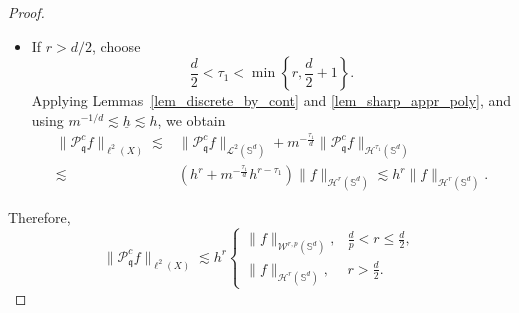 \documentclass[10pt,a4paper]{amsart}
\def\SS{\mathbb{S}}
\def\mq{\mathfrak{q}}
\def\pc{\mathcal{P}^c}
\begin{document}
\begin{proof}
\begin{itemize}
\begin{equation*}
\begin{split}
    \end{split}
\end{equation*}
    \item If $r>d/2$, choose
    \begin{equation*}
        \frac d2<\tau_1<\min\left\{r,\frac d2+1\right\}.
    \end{equation*}
    Applying Lemmas~\ref{lem_discrete_by_cont} and \ref{lem_sharp_appr_poly}, and using $m^{-1/d}\lesssim\underline h\lesssim h$, we obtain
    \begin{equation*}
        \begin{split}
            \|\pc_\mq f\|_{\ell^2(X)}
            \lesssim&\|\pc_\mq f\|_{\mathcal L^2(\SS^d)}
            +m^{-\frac{\tau_1}{d}}\|\pc_\mq f\|_{\mathcal H^{\tau_1}(\SS^d)}\\
            \lesssim&\left(h^r+m^{-\frac{\tau_1}{d}}h^{r-\tau_1}\right)
            \|f\|_{\mathcal H^r(\SS^d)}
            \lesssim h^r\|f\|_{\mathcal H^r(\SS^d)}.
        \end{split}
    \end{equation*}
\end{itemize}
Therefore,
\begin{equation}\label{eqn_poincare1}
    \|\pc_\mq f\|_{\ell^2(X)}
    \lesssim h^r
    \left\{\begin{array}{ll}
        \|f\|_{\mathcal W^{r,p}(\SS^d)},&\frac{d}{p}<r\leq\frac d2,\\[0.3em]
        \|f\|_{\mathcal H^r(\SS^d)},&r>\frac d2.
    \end{array}\right.
\end{equation}


\end{proof}
\end{document}
